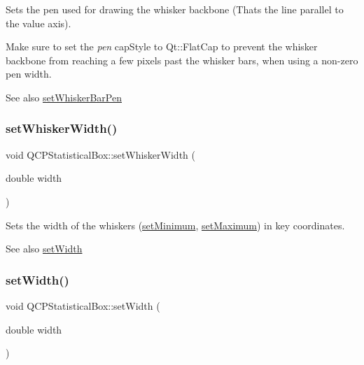 Sets the pen used for drawing the whisker backbone (That\textquotesingle{}s the line parallel to the value axis).

Make sure to set the {\itshape pen} cap\+Style to Qt\+::\+Flat\+Cap to prevent the whisker backbone from reaching a few pixels past the whisker bars, when using a non-\/zero pen width.

\begin{DoxySeeAlso}{See also}
\hyperlink{class_q_c_p_statistical_box_aa8d3e503897788e1abf68dc74b5f147f}{set\+Whisker\+Bar\+Pen} 
\end{DoxySeeAlso}
\hypertarget{class_q_c_p_statistical_box_adf378812446bd66f34d1f7f293d991cd}{}\label{class_q_c_p_statistical_box_adf378812446bd66f34d1f7f293d991cd} 
\subsubsection{\texorpdfstring{set\+Whisker\+Width()}{setWhiskerWidth()}}
{\footnotesize\ttfamily void Q\+C\+P\+Statistical\+Box\+::set\+Whisker\+Width (\begin{DoxyParamCaption}\item[{double}]{width }\end{DoxyParamCaption})}

Sets the width of the whiskers (\hyperlink{class_q_c_p_statistical_box_a84ff7cc61ba44890f0c3e0c99c19941e}{set\+Minimum}, \hyperlink{class_q_c_p_statistical_box_acec5ad1901f00f2c5387cfb4d9787eb3}{set\+Maximum}) in key coordinates.

\begin{DoxySeeAlso}{See also}
\hyperlink{class_q_c_p_statistical_box_a0b62775bd67301b1eba5c785f2b26f14}{set\+Width} 
\end{DoxySeeAlso}
\hypertarget{class_q_c_p_statistical_box_a0b62775bd67301b1eba5c785f2b26f14}{}\label{class_q_c_p_statistical_box_a0b62775bd67301b1eba5c785f2b26f14} 
\subsubsection{\texorpdfstring{set\+Width()}{setWidth()}}
{\footnotesize\ttfamily void Q\+C\+P\+Statistical\+Box\+::set\+Width (\begin{DoxyParamCaption}\item[{double}]{width }\end{DoxyParamCaption})}

